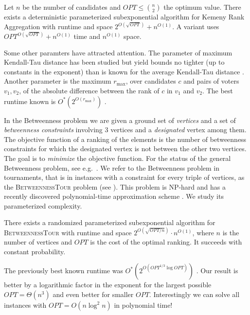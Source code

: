 \documentclass[envcountsame,oribibl]{llncs}
\newcommand{\betTour}{\textsc{BetweennessTour}}
\begin{document}
\begin{corollary} \label{thm:exactKRA}
Let $n$ be the number of candidates and $OPT \le \binom{n}{2}$ the optimum value. There exists a deterministic parameterized subexponential algorithm for Kemeny Rank Aggregation with runtime and space $2^{O(\sqrt{OPT})} + n^{O(1)}$. A variant uses $OPT^{O(\sqrt{OPT})} + n^{O(1)}$ time and $n^{O(1)}$ space.
\end{corollary}

Some other paramters have attracted attention. The parameter of maximum Kendall-Tau distance has been studied but yield bounds no tighter (up to constants in the exponent) than is known for the average Kendall-Tau distance \cite{Betzler09}. Another parameter is the maximum $r_{\max}$, over candidates $c$ and pairs of voters $v_1,v_2$, of the absolute difference between the rank of $c$ in $v_1$ and $v_2$. The best runtime known is $O^*(2^{O(r_{\max})})$ \cite{Betzler09}.

\bigskip

In the Betweenness problem we are given a ground set of \emph{vertices} and a set of \emph{betweenness constraints}
involving $3$ vertices and a \emph{designated} vertex among them.
The objective function of a ranking of the elements is the number of betweenness constraints
for which the designated vertex is not between the other two vertices. The goal is to
\emph{minimize} the objective function. 
For the status of the general Betweenness
problem, see e.g.\ \cite{Opatrny79,Chor98,Ailon07hardness,Charikar09}.
We refer to the Betweenness problem in tournaments, that is in instances with a constraint for every triple of vertices,
as the \betTour{} problem (see \cite{Ailon07hardness}). This problem is NP-hard \cite{Ailon07hardness} and has a recently discovered polynomial-time approximation scheme \cite{Karpinski09betweenness}. We study its parameterized complexity.

\begin{theorem} \label{thm:exactGen}
There exists a randomized parameterized subexponential
   algorithm for \betTour{} with runtime and space $2^{O(\sqrt{OPT/n})} \cdot n^{O(1)}$, where $n$ is the number of vertices and $OPT$ is the cost of the optimal ranking. It succeeds with constant probability.
\end{theorem}

The previously best known runtime was $O^*(2^{O(OPT^{1/3} \log OPT)})$ \cite{Saurabh09}. Our result is better by a logarithmic factor in the exponent for the largest possible $OPT = \Theta(n^3)$ and even better for smaller $OPT$. Interestingly we can solve all instances with $OPT=O(n \log^2 n)$ in polynomial time!
\end{document}
